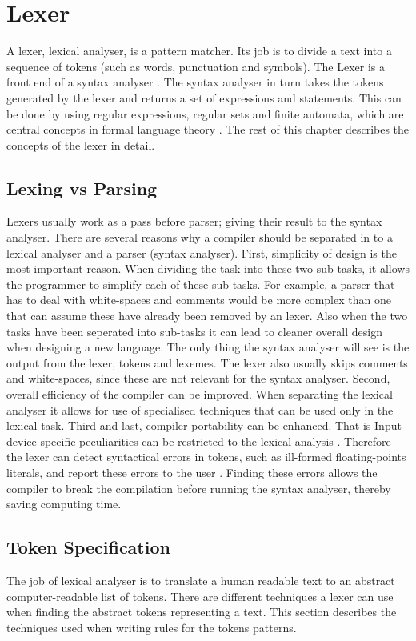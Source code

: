 \chapter{Lexer}
A lexer, lexical analyser, is a pattern matcher. Its job is to divide a text into a sequence of tokens (such as words, punctuation and symbols). The Lexer is a front end of a syntax 
analyser \cite{sebesta2012}. The syntax analyser in turn takes the tokens
generated by the lexer and returns a set of expressions and statements.
This can be done by using regular expressions, regular sets and finite
automata, which are central concepts in formal language theory \cite{Aho1990}.
The rest of this chapter describes the concepts of the lexer in detail.

\section{Lexing vs Parsing}
Lexers usually work as a pass before parser; giving their result to the syntax 
analyser.
There are several reasons why a compiler should be separated in to a lexical 
analyser and a parser (syntax analyser). First, simplicity of design is the most
important reason. When dividing the task into these two sub tasks, it allows the
programmer to simplify each of these sub-tasks. For example, a parser that has to 
deal with white-spaces and comments would be more complex 
than one that can assume these have already been removed by 
an lexer. Also when the two tasks have been seperated into sub-tasks it can lead to 
cleaner overall design when designing a new language.
The only thing the syntax analyser will see is the output from the 
lexer, tokens and lexemes.
The lexer also usually skips comments and white-spaces, since these are not relevant 
for the syntax analyser.
Second, overall efficiency of the compiler can be improved. When separating the 
lexical analyser it allows for use of specialised techniques that can be used 
only in the lexical task.
Third and last, compiler portability can be enhanced. That is Input-device-specific 
peculiarities can be restricted to the lexical analysis \cite{Aho2006}.
Therefore the lexer can detect syntactical errors in tokens, such as ill-formed 
floating-points literals, and report these errors to the user \cite{sebesta2012}.
Finding these errors allows the compiler to break the compilation before
running the syntax analyser, thereby saving computing time. 
\section{Token Specification}
The job of lexical analyser is to translate a human readable text to an abstract 
computer-readable list of tokens. There are different techniques a lexer can
use when finding the abstract tokens representing a text. This section describes the
techniques used when writing rules for the tokens patterns. 

